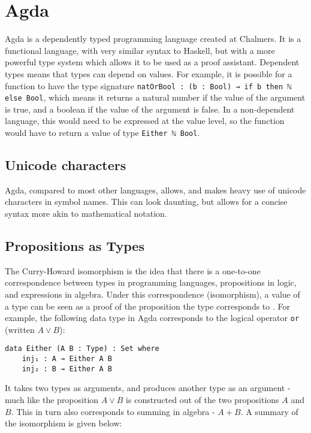 \section{Agda}
Agda is a dependently typed programming language \cite{agdaWebsite} created at Chalmers. It is a functional language, with very similar syntax to Haskell, but with a more powerful type system which allows it to be used as a proof assistant. Dependent types means that types can depend on values. For example, it is possible for a function to have the type signature \texttt{natOrBool : (b : Bool) → if b then ℕ else Bool}, which means it returns a natural number if the value of the argument is true, and a boolean if the value of the argument is false. In a non-dependent language, this would need to be expressed at the value level, so the function would have to return a value of type \texttt{Either ℕ Bool}.

\subsection{Unicode characters}
Agda, compared to most other languages, allows, and makes heavy use of unicode characters in symbol names. This can look daunting, but allows for a concise syntax more akin to mathematical notation. 

\subsection{Propositions as Types}
The Curry-Howard isomorphism \cite{propositionastypes} is the idea that there is a one-to-one correspondence between types in programming languages, propositions in logic, and expressions in algebra. Under this correspondence (isomorphism), a value of a type can be seen as a proof of the proposition the type corresponds to \cite{DependentTypesAtWork}. For example, the following data type in Agda corresponds to the logical operator \texttt{or} (written $A \vee B$):

\begin{verbatim}
data Either (A B : Type) : Set where
    inj₁ : A → Either A B
    inj₂ : B → Either A B
\end{verbatim}

It takes two types as arguments, and produces another type as an argument - much like the proposition $A \vee B$ is constructed out of the two propositions $A$ and $B$. This in turn also corresponds to summing in algebra - $A + B$. A summary of the isomorphism is given below:

